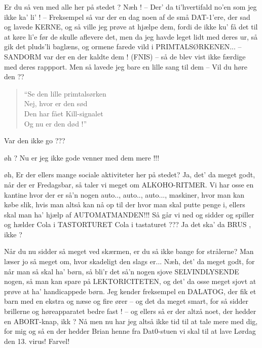 \documentclass[a4paper,11pt]{article}
\begin{document}
\begin{sketch}
  Er du så ven med alle her på stedet ?
 Næh ! -- Der' da ti'hvertifald no'en som jeg ikke ka' li' ! --
       Freksempel så var der en dag noen af de små DAT-1'ere, der sad og 
       lavede KERNE, og så ville jeg prøve at hjælpe dem, fordi de ikke ku' 
       få det til at køre li'e før de skulle aflevere det, men da jeg 
       havde leget lidt med deres ur, så gik det pluds'li baglæns, og 
       ormene farede vild i PRIMTALSØRKENEN... -- SANDORM var der en der kaldte 
       dem ! (FNIS) -- så de blev vist ikke færdige med deres rappport.
       Men så lavede jeg bare en lille sang til dem -- Vil du høre den ??
\begin{quotation}
\noindent       ``Se den lille primtalsørken \\
	 Nej, hvor er den sød \\
	 Den har fået Kill-signalet\\
	 Og nu er den død !''\\
\end{quotation}
       Var den ikke go ???
       
  øh ?
 Nu er jeg ikke gode venner med dem mere !!!

  øh, Er der ellers mange sociale aktiviteter her på stedet?
 Ja, det' da meget godt, når der er Fredagsbar, så taler vi meget om 
       ALKOHO-RITMER. Vi har osse en kantine hvor der er så'n nogen auto.., 
       auto.., auto..., maskiner, hvor man kan købe slik, hvis man altså
       kan nå op til der hvor man skal putte penge i, ellers skal man ha' 
       hjælp af AUTOMATMANDEN!!!   
       Så går vi ned og sidder og spiller og hælder Cola i TASTORTURET 
  Cola i tastaturet ???
 Ja det ska' da BRUS , ikke ?

  Når du nu sidder så meget ved skærmen, er du så ikke bange for 
       strålerne? Man læser jo så meget om, hvor skadeligt den slags er...
 Næh, det' da meget godt, for når man så skal ha' børn, så bli'r
       det så'n nogen sjove SELVINDLYSENDE nogen, så man kan spare på 
       LEKTORICITETEN, og det' da osse meget sjovt at prøve at ha' 
       handicappede børn. Jeg kender freksempel en DALATOG, der fik et barn 
       med en ekstra og næse og fire ører -- og det da meget smart, for så 
       sidder brillerne og høreapparatet bedre fast ! -- og ellers så er der
       altzå noet, der hedder en ABORT-knap, ikk ? 
       Nå men nu har jeg altså ikke tid til at tale
       mere med dig, for mig og så en der hedder Brian henne fra Dat0-stuen
       vi skal til at lave Lørdag den 13. virus! Farvel!

\end{sketch}
\end{document}
